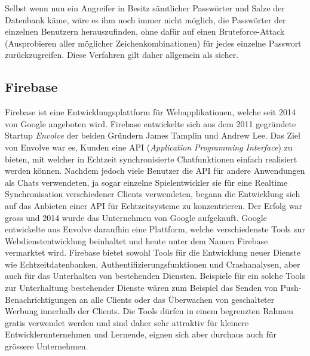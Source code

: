 \documentclass[../main.tex]{subfiles}
\begin{document}
	Selbst wenn nun ein Angreifer in Besitz sämtlicher Passwörter und Salze der Datenbank käme, wäre es ihm noch immer nicht möglich, die Passwörter der einzelnen Benutzern herauszufinden, ohne dafür auf einen Bruteforce-Attack (Ausprobieren aller möglicher Zeichenkombinationen) für jedes einzelne Passwort zurückzugreifen. Diese Verfahren gilt daher allgemein als sicher. \cite{defuse} \cite{security}
	
	
	\subsection{Firebase} \label{DieFirebaseDatenbank}
	Firebase ist eine  Entwicklungsplattform für Webapplikationen, welche seit 2014 von Google angeboten wird. Firebase entwickelte sich aus dem 2011 gegründete Startup \emph{Envolve} der beiden Gründern James Tamplin und Andrew Lee. Das Ziel von Envolve war es, Kunden eine API (\emph{Application Programming Interface}) zu bieten, mit welcher in Echtzeit synchronisierte Chatfunktionen einfach realisiert werden können. Nachdem jedoch viele Benutzer die API für andere Anwendungen als Chats verwendeten, ja sogar einzelne Spielentwickler sie für eine Realtime Synchronisation verschiedener Clients verwendeten, begann die Entwicklung sich auf das Anbieten einer API für Echtzeitsysteme zu konzentrieren. Der Erfolg war gross und 2014 wurde das Unternehmen von Google aufgekauft. Google entwickelte aus Envolve daraufhin eine Plattform, welche verschiedenste Tools zur Webdienstentwicklung beinhaltet und heute unter dem Namen Firebase vermarktet wird. Firebase bietet sowohl Tools für die Entwicklung neuer Dienste wie Echtzeitdatenbanken, Authentifizierungsfunktionen und Crashanalysen, aber auch für das Unterhalten von bestehenden Diensten. Beispiele für ein solche Tools zur Unterhaltung bestehender Dienste wären zum Beispiel das Senden von Push-Benachrichtigungen an alle Clients oder das Überwachen von geschalteter Werbung innerhalb der Clients. Die Tools dürfen in einem begrenzten Rahmen gratis verwendet werden und sind daher sehr attraktiv für kleinere Entwicklerunternehmen und Lernende, eignen sich aber durchaus auch für grössere Unternehmen.\cite{Firebase}
	
\end{document}
